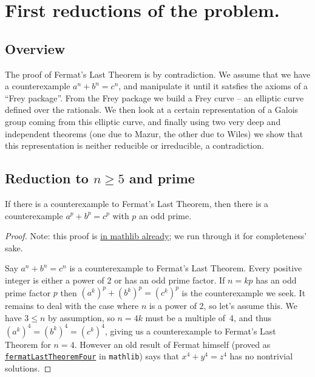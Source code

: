 \chapter{First reductions of the problem.}

\section{Overview}
The proof of Fermat's Last Theorem is by contradiction. We assume that we have a counterexample $a^n+b^n=c^n$, and manipulate it until it satsfies the axioms of a ``Frey package''. From the Frey package we build a Frey curve -- an elliptic curve defined over the rationals. We then look at a certain representation of a Galois group coming from this elliptic curve, and finally using two very deep and independent theorems (one due to Mazur, the other due to Wiles) we show that this representation is neither reducible or irreducible, a contradiction.

\section{Reduction to \texorpdfstring{$n\geq5$}{ngeq5} and prime}

\begin{lemma}\label{FermatLastTheorem.of_odd_primes}\leanok
  If there is a counterexample to Fermat's Last Theorem, then there is a counterexample $a^p+b^p=c^p$
  with $p$ an odd prime.
\end{lemma}
\begin{proof}\leanok
  Note: this proof is \href{https://leanprover-community.github.io/mathlib4_docs/Mathlib/NumberTheory/FLT/Four.html#FermatLastTheorem.of_odd_primes}{in mathlib already};
  we run through it for completeness' sake.

  Say $a^n + b^n = c^n$ is a counterexample to Fermat's Last Theorem. Every positive integer is either
  a power of 2 or has an odd prime factor. If $n=kp$ has an odd prime factor $p$ then
  $(a^k)^p+(b^k)^p=(c^k)^p$ is the counterexample we seek. It remains to deal with the case where
  $n$ is a power of 2, so let's assume this. We have $3\leq n$ by assumption, so
  $n=4k$ must be a multiple of~4, and thus $(a^k)^4=(b^k)^4=(c^k)^4$, giving us a counterexample
  to Fermat's Last Theorem for $n=4$. However an old result of Fermat himself (proved as \href{https://leanprover-community.github.io/mathlib4_docs/Mathlib/NumberTheory/FLT/Four.html#fermatLastTheoremFour}{\tt fermatLastTheoremFour} in {\tt mathlib}) says that $x^4+y^4=z^4$ has no nontrivial solutions.
\end{proof}

